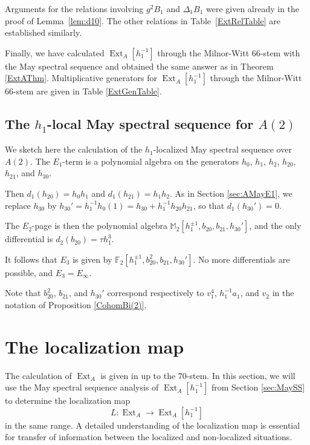\documentclass[10pt]{amsart}
\begin{document}
\begin{pf}
Arguments for the relations involving $g^2B_1$ and $\Delta_1 B_1$ were given already in the proof of Lemma~\ref{lem:d10}. The other relations in Table~\ref{ExtRelTable} are established similarly. 
\end{pf}

Finally, we have calculated $\operatorname{Ext}_A[h_1^{-1}]$ through the
Milnor-Witt 66-stem with the May spectral sequence and obtained the same
answer as in Theorem \ref{ExtAThm}.
Multiplicative generators for $\operatorname{Ext}_A[h_1^{-1}]$ through the
Milnor-Witt 66-stem are given in Table \ref{ExtGenTable}.

\subsection{The $h_1$-local May spectral sequence for $A(2)$}\label{sec:A2MayE1}

We sketch here the calculation of the $h_1$-localized
May spectral sequence over $A(2)$. 
The
$E_1$-term is a polynomial algebra on the generators $h_0$, $h_1$, $h_2$, $h_{20}$, $h_{21}$, and $h_{30}$.

Then $d_1(h_{20}) = h_0 h_1$ and
$d_1(h_{21}) = h_1 h_2$.
As in Section \ref{sec:AMayE1}, we replace $h_{30}$ by $h_{30}' = h_1^{-1} h_0(1) 
= h_{30} + h_1^{-1} h_{20} h_{21}$,
so that $d_1 (h_{30}') = 0$.

The $E_2$-page is then the 
polynomial algebra ${\ensuremath{\mathbb{M}}}_2 [ h_1^{\pm 1}, b_{20}, b_{21}, h_{30}' ]$, and the only differential is
$d_2 ( b_{20} ) = \tau h_1^3$.

It follows that $E_3$ is given by ${\ensuremath{\mathbb{F}}}_2 [ h_1^{\pm 1}, b_{20}^2, b_{21}, h_{30}' ]$. No more differentials are possible, and $E_3=E_\infty$.

Note that $b_{20}^2$, $b_{21}$, and $h_{30}'$ correspond
respectively to $v_1^4$, $h_1^{-1} a_1$, and $v_2$ 
in the notation of Proposition \ref{CohomBi(2)}.

\section{The localization map}\label{sec:LocMap}

The calculation of $\operatorname{Ext}_A$ is given in \cite{Istems} up to the $70$-stem. 
In this section, we will use the May spectral sequence analysis of $\operatorname{Ext}_A[h_1^{-1}]$
from Section \ref{sec:MaySS} to determine the localization map
\[ L:\operatorname{Ext}_A {\longrightarrow} \operatorname{Ext}_A [h_1^{-1}] \]
in the same range.
A detailed understanding of the localization map is essential for transfer of
information between the localized and non-localized situations.
\end{document}

